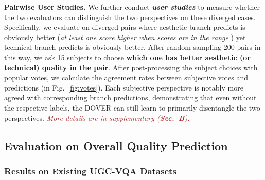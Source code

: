 \documentclass[10pt,twocolumn,letterpaper]{article}
\renewcommand{\paragraph}[1]{\noindent \textbf{#1}}
\begin{document}
\paragraph{Pairwise User Studies.}
\label{sec:6b}
We further conduct \textbf{\textit{user studies}} to measure whether the two evaluators can distinguish the two perspectives on these diverged cases. Specifically, we evaluate on diverged pairs  where aesthetic branch predicts  is obviously better (\textit{at least one score higher when scores are in the range }) yet technical branch predicts  is obviously better. After random sampling 200 pairs in this way, we ask 15 subjects to choose {\textbf{which one has better {{aesthetic}} (or {{technical}}) quality in the pair}}. After post-processing the subject choices with popular votes, we calculate the agreement rates between subjective votes and predictions (in Fig.~\ref{fig:votes}). Each subjective perspective is notably more agreed with corresponding branch predictions, demonstrating that even without the respective labels, the DOVER can still learn to primarily disentangle the two perspectives. \textcolor{brown}{\textit{More details are in supplementary (\textbf{Sec.~B}).}}









\subsection{Evaluation on Overall Quality Prediction}
\label{sec:evaoverall}



\subsubsection{Results on Existing UGC-VQA Datasets}
\label{sec:benchmark}
\end{document}
